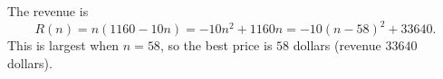 The revenue is
\[R(n)=n(1160-10n)=-10n^2+1160n=-10(n-58)^2+33640 .\]
This is largest when $n=58$, so the best price is $\boxed{58}$ dollars (revenue $33640$ dollars).
